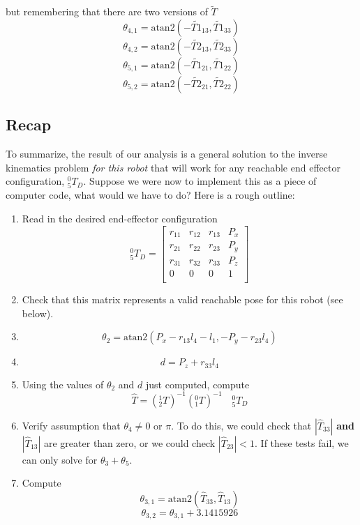 \begin{ExampleCont}

but remembering that there are two versions of $\tilde{T}$
\[
\theta_{4,1} = \mathrm{atan2}(-\tilde{T1}_{13}, \tilde{T1}_{33})
\]
\[
\theta_{4,2} = \mathrm{atan2}(-\tilde{T2}_{13}, \tilde{T2}_{33})
\]
\[
\theta_{5,1} =\mathrm{atan2}(-\tilde{T1}_{21}, \tilde{T1}_{22})
\]
\[
\theta_{5,2} =\mathrm{atan2}(-\tilde{T2}_{21}, \tilde{T2}_{22})
\]


\subsection*{Recap}
To summarize, the result of our analysis is a general solution to the
inverse kinematics problem {\it for this robot} that will work for any reachable end
effector configuration, $^0_5T_D$.  Suppose we were now to implement this as a
piece of computer code, what would we have to do?  Here is a rough outline:
\begin{enumerate}
\item Read in the desired end-effector configuration
\[
^0_5T_D =
\left[
\begin{array}{cccc}
r_{11} & r_{12} & r_{13} & P_x \\
r_{21} & r_{22} & r_{23} & P_y \\
r_{31} & r_{32} & r_{33} & P_z \\
0&0&0&1\\
\end{array}
\right]
\]

\item Check that this matrix represents a valid
reachable pose for this robot
(see below).	%

\item
\[
\theta_2 = \mathrm{atan2}(P_x-r_{13}l_4 -l_1,-P_y-r_{23}l_4)
\]

\item
\[
d = P_z + r_{33}l_4
\]

\item Using the values of $\theta_2$ and $d$ just computed, compute
\[
\hat{T} = (^1_2T)^{-1}   (^0_1T)^{-1}  \quad {^0_5T_D}
\]

\item Verify assumption that $\theta_4 \neq 0$ or $\pi$. To do this,
we could
check that $|\hat{T}_{33}|$ {\bf and} $|\hat{T}_{13}|$ are greater than
zero, or we could check $|\hat{T}_{23}| < 1$.
If these tests fail, we can only solve for $\theta_3 + \theta_5$.
%
\item
Compute
\[
\theta_{3,1} = \mathrm{atan2}(\hat{T}_{33},\hat{T}_{13} )
\]
\[
\theta_{3,2} = \theta_{3,1}+ 3.1415926
\]


\end{enumerate}
\end{ExampleCont}
